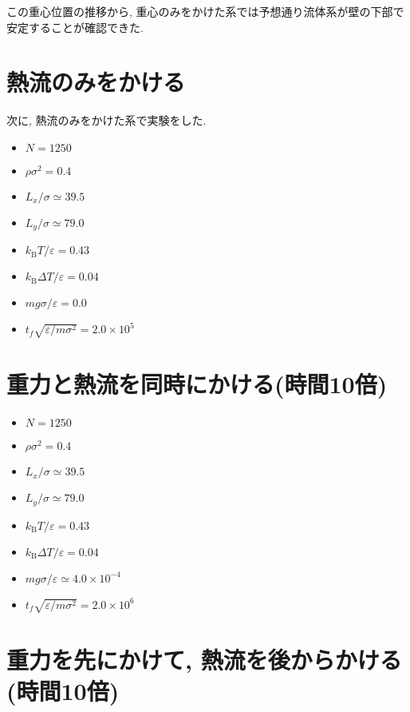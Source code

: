 

この重心位置の推移から, 重心のみをかけた系では予想通り流体系が壁の下部で安定することが確認できた. 

\section{熱流のみをかける}\label{sec:g0}

次に, 熱流のみをかけた系で実験をした. 

\begin{itemize}
  \item $N = 1250$
  \item $\rho {\sigma}^2 = 0.4$
  \item $L_x / \sigma \simeq 39.5$
  \item $L_y / \sigma \simeq 79.0$
  \item $k_{\text{B}} T / \varepsilon = 0.43$
  \item $k_{\text{B}} \Delta T / \varepsilon = 0.04$
  \item $mg\sigma/\varepsilon = 0.0$
  \item $t_f \sqrt{\varepsilon / m \sigma^2} = 2.0 \times 10^{5}$
\end{itemize}



\section{重力と熱流を同時にかける(時間10倍)}\label{sec:RaRtmap10}

\begin{itemize}
  \item $N = 1250$
  \item $\rho {\sigma}^2 = 0.4$
  \item $L_x / \sigma \simeq 39.5$
  \item $L_y / \sigma \simeq 79.0$
  \item $k_{\text{B}} T / \varepsilon = 0.43$
  \item $k_{\text{B}} \Delta T / \varepsilon = 0.04$
  \item $mg\sigma/\varepsilon \simeq 4.0 \times 10^{-4}$
  \item $t_f \sqrt{\varepsilon / m \sigma^2} = 2.0 \times 10^{6}$
\end{itemize}



\section{重力を先にかけて, 熱流を後からかける(時間10倍)}\label{sec:RaRtmap10_drop}

